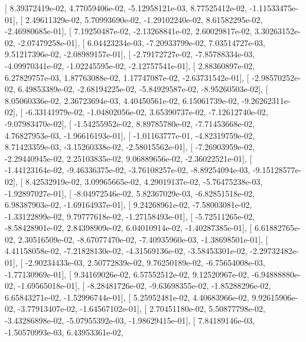 \documentclass{article}
\begin{document}
       [  8.39372419e-02,   4.77059406e-02,  -5.12958121e-03,
          8.77525412e-02,  -1.11533475e-01],
       [  2.49611329e-02,   5.70993690e-02,  -1.29102240e-02,
          8.61582295e-02,  -2.46980685e-01],
       [  7.19250487e-02,  -2.13268841e-02,   2.60029817e-02,
          3.30263152e-02,  -2.07479258e-01],
       [  6.04423234e-03,  -7.20933799e-02,   7.03514727e-03,
          9.51217396e-02,  -2.08989157e-01],
       [ -2.79172727e-02,  -7.85788334e-03,  -4.09970341e-02,
         -1.02245595e-02,  -2.12757541e-01],
       [  2.88360897e-02,   6.27829757e-03,   1.87763088e-02,
          1.17747087e-02,  -2.63731542e-01],
       [ -2.98570252e-02,   6.49853389e-02,  -2.68194225e-02,
         -5.84929587e-02,  -8.95260503e-02],
       [  8.05060336e-02,   2.36723694e-03,   4.40450561e-02,
          6.15061739e-02,  -9.26262311e-02],
       [ -6.33141979e-02,  -1.04802056e-02,   3.65390737e-02,
         -7.12612740e-02,  -9.07983470e-02],
       [ -1.54255952e-02,   8.89785780e-02,  -7.71453668e-02,
          4.76827953e-03,  -1.96616193e-01],
       [ -1.01163777e-01,  -4.82319759e-02,   8.71423359e-03,
         -3.15260338e-02,  -2.58015562e-01],
       [ -7.26903959e-02,  -2.29440945e-02,   2.25103835e-02,
          9.06889656e-02,  -2.36022521e-01],
       [ -1.44123164e-02,  -9.46336375e-02,  -3.76108257e-02,
         -8.89254094e-03,  -9.15128577e-02],
       [  8.42532919e-02,   3.09965665e-02,   4.29019137e-02,
         -5.76475238e-03,  -1.92897027e-01],
       [ -8.04972546e-02,   5.82367029e-03,  -6.82851518e-02,
          6.98387903e-02,  -1.69164937e-01],
       [  9.24268961e-02,  -7.58003081e-02,  -1.33122899e-02,
          9.79777618e-02,  -1.27158493e-01],
       [ -5.72511265e-02,  -8.58428901e-02,   2.84398909e-02,
          6.04010914e-02,  -1.40287385e-01],
       [  6.61882765e-02,   2.30516509e-02,  -8.67077470e-02,
         -7.40935960e-03,  -1.38698501e-01],
       [  4.41158058e-02,  -7.21828130e-02,  -4.31569136e-02,
         -3.58453301e-02,  -2.29732482e-01],
       [ -2.90234433e-03,   2.50772839e-02,   9.76250189e-02,
         -6.75654008e-03,  -1.77130969e-01],
       [  9.34169026e-02,   6.57552512e-02,   9.12520967e-02,
         -6.94888880e-02,  -1.69565018e-01],
       [ -8.28481726e-02,  -9.63698355e-02,  -1.85288296e-02,
          6.65843271e-02,  -1.52996744e-01],
       [  5.25952481e-02,   4.40683966e-02,   9.92615906e-02,
         -3.77913407e-02,  -1.64567102e-01],
       [  2.70451180e-02,   5.50877798e-02,  -3.43286898e-02,
         -5.07955392e-03,  -1.98629415e-01],
       [  7.84189146e-03,  -1.50570993e-03,   6.43953361e-02,
\end{document}
